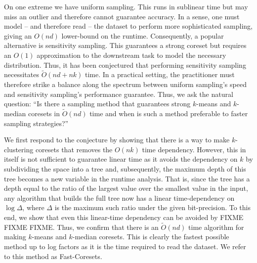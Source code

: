 On one extreme we have uniform sampling. This runs in sublinear time but may miss an outlier  and therefore cannot guarantee accuracy.
In a sense, one must model  -- and therefore read -- the dataset to perform more sophisticated sampling, giving an $O(nd)$ lower-bound on
the runtime. Consequently, a popular alternative is sensitivity sampling. This guarantees a strong coreset but requires an $O(1)$ approximation to the downstream task  to
model the necessary distribution. Thus, it has been conjectured that performing sensitivity sampling necessitates $\tilde{O}(nd + nk)$ time.
In a practical setting, the practitioner must therefore strike a balance along the spectrum between uniform sampling's speed and sensitivity sampling's
performance guarantee. Thus, we ask the natural question: ``Is there a sampling method that guarantees strong $k$-means
and $k$-median coresets in $\tilde{O}(nd)$ time and when is such a method preferable to faster sampling strategies?'' 

We first respond to the conjecture  by showing that there is a way to make $k$-clustering coresets that removes the $O(nk)$ time dependency. However, this in
itself is not sufficient to guarantee linear time as it avoids the dependency on $k$ by subdividing the space into a tree and, subsequently, the
maximum depth of this tree becomes a new variable in the runtime analysis.  That is, since the tree has a depth equal to the ratio of the largest value over
the smallest value in the input, any algorithm that builds the full tree now has a linear time-dependency on $\log \Delta$, where $\Delta$ is the maximum
such ratio under the given bit-precision. To this end, we show that even this linear-time dependency can be avoided by FIXME FIXME FIXME. Thus, we
confirm that there is an $\tilde{O}(nd)$ time algorithm for making $k$-means and $k$-median coresets. This is clearly the fastest possible method up to log
factors as it is the time required to read the dataset. We refer to this method as Fast-Coresets.

